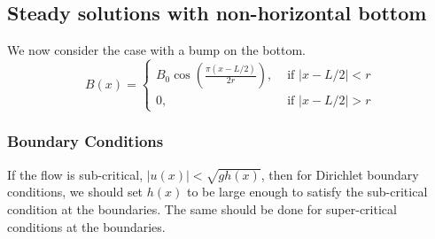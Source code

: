 \subsection{Steady solutions with non-horizontal bottom} %
\label{sub:steady_solutions_with_non_horizontal_bottom}
We now consider the case with a bump on the bottom.
\begin{equation}
	B(x) = 
	\begin{cases}
		B_0 \cos \left( \frac{\pi(x-L/2)}{2r} \right), &\text{ if }|x-L/2|<r\\
		0, &\text{ if }|x-L/2|>r 
	\end{cases}
	\label{eq:bxEquation} 
\end{equation}
\subsubsection{Boundary Conditions} %
\label{ssub:boundary_conditions}

If the flow is sub-critical, $|u(x)|<\sqrt{gh(x)}$, then for Dirichlet boundary conditions, we should set $h(x)$ to be large enough to satisfy the sub-critical condition at the boundaries.  The same should be done for super-critical conditions at the boundaries.

